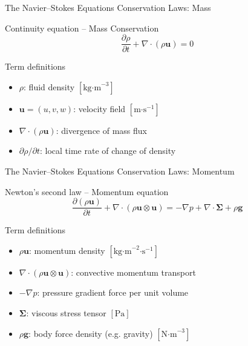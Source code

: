 \begin{frame}{The Navier--Stokes Equations}
\small
\textcolor{red_unipd}{\Large Conservation Laws: Mass}

\vspace{0.8em}

\begin{alertblock}{Continuity equation -- Mass Conservation}
\[
\dfrac{\partial \rho}{\partial t} + \nabla\!\cdot\!(\rho \mathbf{u}) = 0
\]
\end{alertblock}

\vfill

\begin{block}{Term definitions}
\begin{itemize}
  \item \(\rho\): fluid density \([\text{kg·m}^{-3}]\)
  \item \(\mathbf{u} = (u,v,w)\): velocity field \([\text{m·s}^{-1}]\)
  \item \(\nabla\!\cdot\!(\rho \mathbf{u})\): divergence of mass flux
  \item \(\partial \rho / \partial t\): local time rate of change of density
\end{itemize}
\end{block}
\end{frame}




\begin{frame}{The Navier--Stokes Equations}
\small
\textcolor{red_unipd}{\Large Conservation Laws: Momentum}

\vspace{0.8em}

\begin{alertblock}{Newton’s second law -- Momentum equation}
\[
\dfrac{\partial (\rho \mathbf{u})}{\partial t}
+ \nabla\!\cdot\!(\rho \mathbf{u}\otimes\mathbf{u})
= -\nabla p + \nabla\!\cdot\!\boldsymbol{\Sigma} + \rho \mathbf{g}
\]
\end{alertblock}

\vfill

\begin{block}{Term definitions}
\begin{itemize}
  \item \(\rho \mathbf{u}\): momentum density \([\text{kg·m}^{-2}\text{·s}^{-1}]\)
  \item \(\nabla\!\cdot\!(\rho \mathbf{u}\otimes\mathbf{u})\): convective momentum transport
  \item \(-\nabla p\): pressure gradient force per unit volume
  \item \(\boldsymbol{\Sigma}\): viscous stress tensor \([\text{Pa}]\)
  \item \(\rho \mathbf{g}\): body force density (e.g. gravity) \([\text{N·m}^{-3}]\)
\end{itemize}
\end{block}
\end{frame}




